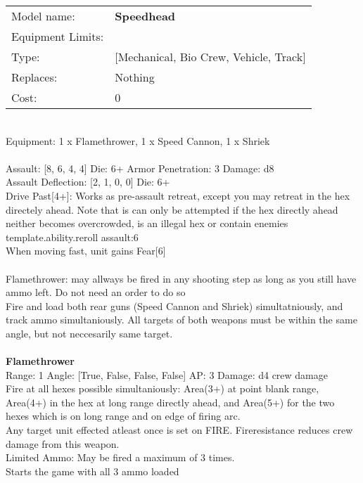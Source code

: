 \noindent
\begin{tabular}{ll}
Model name: &{\bf Speedhead } \\
Equipment Limits: & \\
Type: &[Mechanical, Bio Crew, Vehicle, Track] \\
Replaces: &Nothing \\
Cost: & 0\\
\end{tabular}
\ \\
Equipment: 1 x Flamethrower, 1 x Speed Cannon, 1 x Shriek \\
\ \\
Assault: [8, 6, 4, 4] Die: 6+ Armor Penetration: 3 Damage: d8 \\
Assault Deflection: [2, 1, 0, 0] Die: 6+\\
\indent Drive Past[4+]: Works as pre-assault retreat, except you may retreat in the hex directely ahead. Note that is can only be attempted if the hex directly ahead neither becomes overcrowded, is an illegal hex or contain enemies\\ 
{template.ability.reroll assault:6}\\ 
When moving fast, unit gains Fear[6]\\ 
 
\ \\
Flamethrower: may allways be fired in any shooting step as long as you still have ammo left. Do not need an order to do so\\ 
Fire and load both rear guns (Speed Cannon and Shriek) simultatniously, and track ammo simultaniously. All targets of both weapons must be within the same angle, but not neccesarily same target.\\ 

\ \\
{\bf Flamethrower } \\



Range: 1  Angle: [True, False, False, False] AP: 3 Damage: d4 crew damage \\
Fire at all hexes possible simultaniously: Area(3+) at point blank range, Area(4+) in the hex at long range directly ahead, and Area(5+) for the two hexes which is on long range and on edge of firing arc. \\ 
 Any target unit effected atleast once is set on FIRE. Fireresistance reduces crew damage from this weapon. \\ 
 Limited Ammo: May be fired a maximum of 3 times. \\ 
 Starts the game with all 3 ammo loaded\\ 




